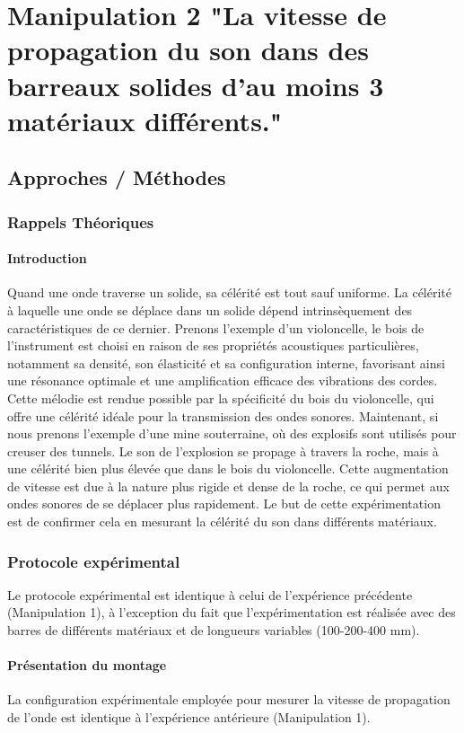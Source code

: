 \section{Manipulation 2 "La vitesse de propagation du son dans des
barreaux solides d'au moins 3 matériaux différents."}
\subsection{Approches / Méthodes}
\subsubsection{\large Rappels Théoriques}
\paragraph{Introduction}
Quand une onde traverse un solide, 
sa célérité est tout sauf uniforme.
La célérité à laquelle une onde se déplace
dans un solide dépend intrinsèquement 
des caractéristiques de ce dernier.
Prenons l'exemple d'un violoncelle, 
le bois de l'instrument est choisi 
en raison de ses propriétés acoustiques 
particulières, notamment sa densité, son 
élasticité et sa configuration interne, 
favorisant ainsi une résonance optimale 
et une amplification efficace des vibrations 
des cordes.
Cette mélodie est rendue possible par la 
spécificité du bois du violoncelle, qui 
offre une célérité idéale pour la transmission 
des ondes sonores.
Maintenant, si nous prenons l'exemple d'une 
mine souterraine, où des explosifs sont 
utilisés pour creuser des tunnels.
Le son de l'explosion se propage à travers 
la roche, mais à une célérité bien plus 
élevée que dans le bois du violoncelle. 
Cette augmentation de vitesse est due à la 
nature plus rigide et dense de la roche, 
ce qui permet aux ondes sonores de se 
déplacer plus rapidement. Le but de cette 
expérimentation est de confirmer cela 
en mesurant la célérité du son dans différents 
matériaux.
\subsubsection{\large Protocole expérimental}
Le protocole expérimental est identique 
à celui de l'expérience précédente (Manipulation 1), 
à l'exception du fait que l'expérimentation 
est réalisée avec des barres de différents 
matériaux et de longueurs variables 
(100-200-400 mm).
\paragraph{Présentation du montage}
La configuration expérimentale employée 
pour mesurer la vitesse de propagation 
de l'onde est identique à l'expérience 
antérieure (Manipulation 1).

